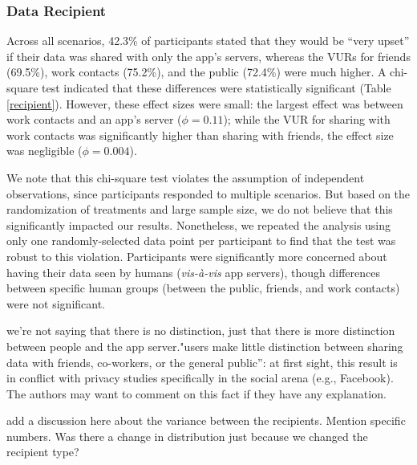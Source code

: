 \subsubsection{Data Recipient}
Across all scenarios, 42.3\% of participants stated that they would be ``very upset'' if their data was shared with only the app's servers, whereas the VURs for friends (69.5\%), work contacts (75.2\%), and the public (72.4\%) were much higher. A chi-square test indicated that these differences were statistically significant (Table \ref{recipient}). However, these effect sizes were small: the largest effect was between work contacts and an app's server ($\phi=0.11$); while the VUR for sharing with work contacts was significantly higher than sharing with friends, the effect size was negligible ($\phi=0.004$). 

We note that this chi-square test violates the assumption of independent observations, since participants responded to multiple scenarios. But based on the randomization of treatments and large sample size, we do not believe that this significantly impacted our results. Nonetheless, we repeated the analysis using only one randomly-selected data point per participant to find that the test was robust to this violation. Participants were significantly more concerned about having their data seen by humans ({\it vis-{\`a}-vis} app servers), though differences between specific human groups (between the public, friends, and work contacts) were not significant.

{\color {red} we're not saying that there is no distinction, just that there is more distinction between people and the app server."users make little distinction between sharing data with friends, co-workers, or the general public”: at first sight, this result is in conflict with privacy studies specifically in the social arena (e.g., Facebook). The authors may want to comment on this fact if they have any explanation.}

{\color {red} add a discussion here about the variance between the recipients. Mention specific numbers. Was there a change in distribution just because we changed the recipient type?}
